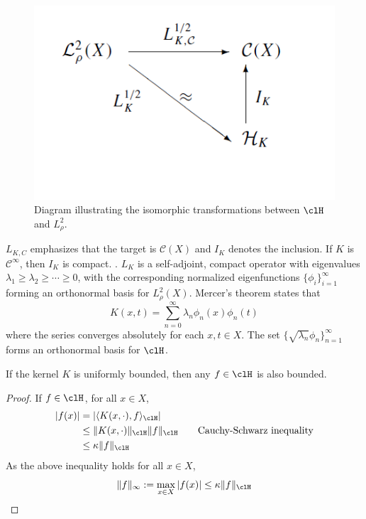 \begin{figure}[htbp]
	\centering
	\includegraphics[width=5in]{images/chap2a_RKHS_diagram}
	\caption[EPS format diagram. Note: no filetype is designated by adding an extension.]{Diagram illustrating the isomorphic transformations between $\clH$ and $L^2_\rho$.}
\end{figure}

$L_{K,C}$ emphasizes that the target is $\mathcal{C}(X)$ and $I_K$ denotes the inclusion. If $K$ is $\mathcal{C}^\infty$, then $I_K$ is compact. . $L_K$ is a self-adjoint, compact operator with eigenvalues $\lambda_1 \geq \lambda_2 \geq \cdots \geq 0$, with the corresponding normalized eigenfunctions $\{\phi_i\}_{i=1}^\infty$ forming an orthonormal basis for $L^2_\rho(X)$. Mercer's theorem states that 
\[
K(x,t) = \sum_{n=0}^\infty \lambda_n \phi_n(x) \phi_n(t)
\]
where the series converges absolutely for each $x,t \in X$. The set $\{\sqrt{\lambda_n}\phi_n\}_{n=1}^\infty$ forms an orthonormal basis for $\clH$. 
\noindent \begin{proposition}
	If the kernel $K$ is uniformly bounded, then any $f \in \clH$ is also bounded. 
\end{proposition}
\begin{proof}
		If $f \in \clH$, for all $x \in X$,
		\[
		\begin{aligned}
		|f(x)| &= |\langle K(x,\cdot), f \rangle_\clH| \\
		& \leq \|K(x,\cdot)\|_\clH \|f\|_\clH \qquad{\text{Cauchy-Schwarz inequality}}\\ 
		& \leq \kappa \|f\|_\clH
		\end{aligned}
		\]
		As the above inequality holds for all $x \in X$, 
		\[
		\|f\|_\infty := \max_{x\in X}|f(x)| \leq \kappa \|f\|_\clH
		\]
\end{proof}

